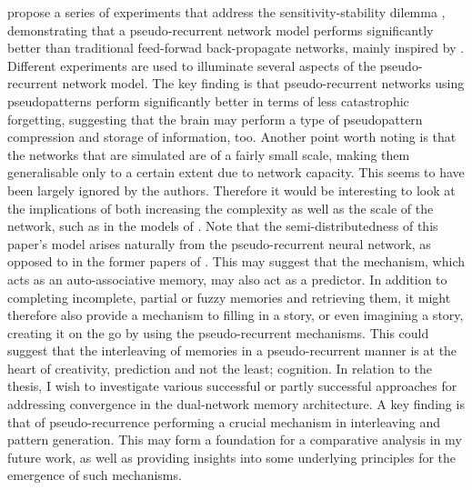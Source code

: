 \cite{French1997} propose a series of experiments that address the sensitivity-stability dilemma \citep{Hebb1949}, demonstrating that a pseudo-recurrent network model performs significantly better than traditional feed-forwad back-propagate networks, mainly inspired by \cite{McClelland1995}. Different experiments are used to illuminate several aspects of the pseudo-recurrent network model. The key finding is that pseudo-recurrent networks using pseudopatterns perform significantly better in terms of less catastrophic forgetting, suggesting that the brain may perform a type of pseudopattern compression and storage of information, too. Another point worth noting is that the networks that are simulated are of a fairly small scale, making them generalisable only to a certain extent due to network capacity. This seems to have been largely ignored by the authors. Therefore it would be interesting to look at the implications of both increasing the complexity as well as the scale of the network, such as in the models of \citep{Hattori2010, Hattori2014}. Note that the semi-distributedness of this paper's model arises naturally from the pseudo-recurrent neural network, as opposed to in the former papers of \cite{French1992, French1994}. This may suggest that the mechanism, which acts as an auto-associative memory, may also act as a predictor. In addition to completing incomplete, partial or fuzzy memories and retrieving them, it might therefore also provide a mechanism to filling in a story, or even imagining a story, creating it on the go by using the pseudo-recurrent mechanisms. This could suggest that the interleaving of memories in a pseudo-recurrent manner is at the heart of creativity, prediction and not the least; cognition. In relation to the thesis, I wish to investigate various successful or partly successful approaches for addressing convergence in the dual-network memory architecture. A key finding is that of pseudo-recurrence performing a crucial mechanism in interleaving and pattern generation. This may form a foundation for a comparative analysis in my future work, as well as providing insights into some underlying principles for the emergence of such mechanisms.

